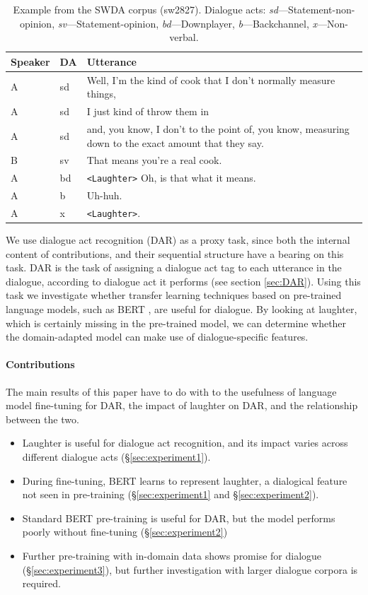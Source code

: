 \documentclass[11pt,a4paper]{article}
\begin{document}
\begin{table}
      \small
  \centering
  \begin{tabularx}{\linewidth}{llL}
    \toprule
    Speaker & DA & Utterance \\ \midrule
    A	&sd	& Well, I'm the kind of cook that I don't normally measure things,  \\
    A	&sd	& I just kind of throw them in \\
    A	&sd	& and, you know, I don't to the point of, you know, measuring down to the exact amount that they say.  \\
    B	&sv	& That means you're a real cook. \\
    A	&bd	& \texttt{<Laughter>} Oh, is that what it means.  \\
    A	&b	& Uh-huh.  \\
    A	&x	& \texttt{<Laughter>}.\\
             \bottomrule
  \end{tabularx}
  \caption{Example from the SWDA corpus (sw2827). Dialogue acts: \emph{sd}---Statement-non-opinion, \emph{sv}---Statement-opinion, \emph{bd}---Downplayer, \emph{b}---Backchannel, \emph{x}---Non-verbal. }
  \label{table:example}
\end{table}

We use dialogue act recognition (DAR) as a proxy task, since both the internal content of contributions, and their sequential structure have a bearing on this task. DAR is the task of assigning a dialogue act tag to each utterance in the dialogue, according to dialogue act it performs (see section \ref{sec:DAR}).
Using this task we investigate whether transfer learning techniques based on pre-trained language models, such as BERT \citep{devlinBERTPretrainingDeep2018}, are useful for dialogue.
By looking at laughter, which is certainly missing in the pre-trained model, we can determine whether the domain-adapted model can make use of dialogue-specific features.

\paragraph{Contributions}
The main results of this paper have to do with to the usefulness of language model fine-tuning for DAR, the impact of laughter on DAR, and the relationship between the two.
\begin{itemize}
  \item Laughter is useful for dialogue act recognition, and its impact varies across different dialogue acts (\S\ref{sec:experiment1}).
  \item During fine-tuning, BERT learns to represent laughter, a dialogical feature not seen in pre-training (\S\ref{sec:experiment1} and \S\ref{sec:experiment2}).
  \item Standard BERT pre-training is useful for DAR, but the model performs poorly without fine-tuning (\S\ref{sec:experiment2})
  \item Further pre-training with in-domain data shows promise for dialogue (\S\ref{sec:experiment3}), but further investigation with larger dialogue corpora is required.
  \end{itemize}
\end{document}
